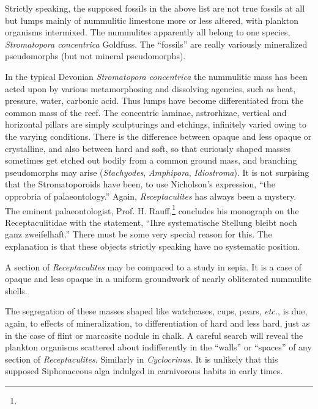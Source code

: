\documentclass[a4paper, 12pt, oneside]{article}
\begin{document}
Strictly speaking, the supposed fossils in the above list are not true fossils at all but lumps mainly of nummulitic limestone more or less altered, with plankton organisms intermixed. The nummulites apparently all belong to one species, \emph{Stromatopora concentrica} Goldfuss. The ``fossils'' are really variously mineralized pseudomorphs (but not mineral pseudomorphs).

In the typical Devonian \emph{Stromatopora concentrica} the nummulitic mass has been acted upon by various metamorphosing and dissolving agencies, such as heat, pressure, water, carbonic acid. Thus lumps have become differentiated from the common mass of the reef. The concentric laminae, astrorhizae, vertical and horizontal pillars are simply sculpturings and etchings, infinitely varied owing to the varying conditions. There is the difference between opaque and less opaque or crystalline, and also between hard and soft, so that curiously shaped masses sometimes get etched out bodily from a common ground mass, and branching pseudomorphs may arise (\emph{Stachyodes}, \emph{Amphipora}, \emph{Idiostroma}). It is not surpising that the Stromatoporoids have been, to use Nicholson's expression, ``the opprobria of palaeontology.'' Again, \emph{Receptaculites} has always been a mystery. The eminent palaeontologist, Prof. H. Rauff,\footnote{} concludes his monograph on the Receptaculitidae with the statement, ``Ihre systematische Stellung bleibt noch ganz zweifelhaft.'' There must be some very special reason for this. The explanation is that these objects strictly speaking have no systematic position.

A section of \emph{Receptaculites} may be compared to a study in sepia. It is a case of opaque and less opaque in a uniform groundwork of nearly obliterated nummulite shells.

The segregation of these masses shaped like watchcases, cups, pears, \emph{etc.}, is due, again, to effects of mineralization, to differentiation of hard and less hard, just as in the case of flint or marcasite nodule in chalk. A careful search will reveal the plankton organisms scattered about indifferently in the ``walls'' or ``spaces'' of any section of \emph{Receptaculites}. Similarly in \emph{Cyclocrinus}. It is unlikely that this supposed Siphonaceous alga indulged in carnivorous habits in early times.
\end{document}
